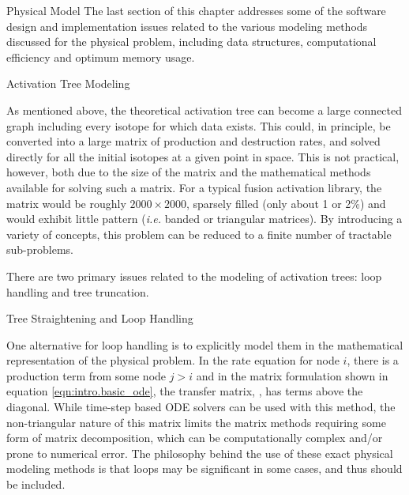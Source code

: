 \begin{chapter}{Physical Model\label{chap:physical}}
The last section of this chapter addresses some of the software design
and implementation issues related to the various modeling methods
discussed for the physical problem, including data structures,
computational efficiency and optimum memory usage.

\begin{section}{Activation Tree Modeling\label{sec:physical.chains}}
  
  As mentioned above, the theoretical activation tree can become a
  large connected graph including every isotope for which data exists.
  This could, in principle, be converted into a large matrix of
  production and destruction rates, and solved directly for all the
  initial isotopes at a given point in space.  This is not practical,
  however, both due to the size of the matrix and the mathematical
  methods available for solving such a matrix.  For a typical fusion
  activation library, the matrix would be roughly $2000 \times 2000$,
  sparsely filled (only about 1 or 2\%) and would exhibit little
  pattern (\textsl{i.e.} banded or triangular matrices).  By
  introducing a variety of concepts, this problem can be reduced to a
  finite number of tractable sub-problems.  
  
  There are two primary issues related to the modeling of activation
  trees: loop handling and tree truncation.
  
  \begin{subsection}{Tree Straightening and Loop Handling}
    
    \begin{floatingfigure}{0.55\columnwidth}
      \begin{center}
        \caption{Fully straightened and unlinked reaction
          tree.}\label{fig:physical.straight_tree}
      \end{center}
    \end{floatingfigure}
    
    One alternative for loop handling is to explicitly model them in
    the mathematical representation of the physical problem.  In the
    rate equation for node $i$, there is a production term from some
    node $j>i$ and in the matrix formulation shown in equation
    \ref{eqn:intro.basic_ode}, the transfer matrix, , has terms
    above the diagonal.  While time-step based ODE solvers can be used
    with this method, the non-triangular nature of this matrix limits
    the matrix methods requiring some form of matrix decomposition,
    which can be computationally complex and/or prone to numerical
    error.  The philosophy behind the use of these exact physical
    modeling methods is that loops may be significant in some cases,
    and thus should be included.
    

\end{subsection}
\end{section}
\end{chapter}
